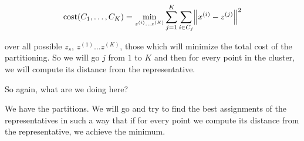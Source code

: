 \documentclass[a4paper, 12pt]{article}
\begin{document}
\begin{equation}
\text{cost}(C_1, \ldots ,C_K) = \min_{z^{(i)} \ldots z^{(K)}}\sum_{j=1}^{K}\sum_{i \in C_j} \norm{x^{(i)} - z^{(j)}}^2
\end{equation}

over all possible \(z_s\), \(z^{(1)} \ldots z^{(K)}\), those which will minimize
the total cost of the partitioning. So we will go \(j\) from \(1\) to \(K\) and
then for every point in the cluster, we will compute its distance from the
representative.

So again, what are we doing here?

We have the partitions. We will go and try to find the best assignments of the
representatives in such a way that if for every point we compute its distance
from the representative, we achieve the minimum.
\end{document}
